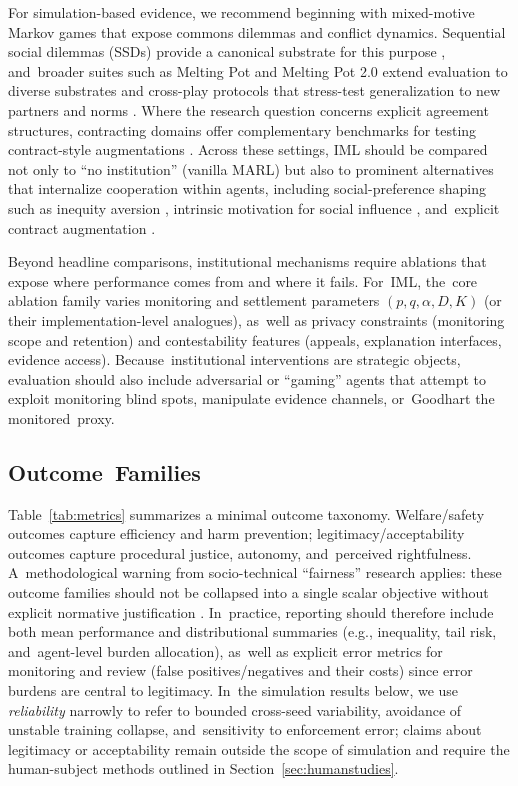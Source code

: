 \documentclass[mca,article,accept,pdftex,oneauthor]{Definitions/mdpi}
\begin{document}
For simulation-based evidence, we recommend beginning with mixed-motive Markov games that expose commons dilemmas and conflict dynamics. Sequential social dilemmas (SSDs) provide a canonical substrate for this purpose \citep{Leibo2017SSD}, and~broader suites such as Melting Pot and Melting Pot 2.0 extend evaluation to diverse substrates and cross-play protocols that stress-test generalization to new partners and norms \citep{Leibo2021MeltingPot,Agapiou2022MeltingPot2}. Where the research question concerns explicit agreement structures, contracting domains offer complementary benchmarks for testing contract-style augmentations \citep{Haupt2023Contracts}. Across these settings, IML should be compared not only to ``no institution'' (vanilla MARL) but also to prominent alternatives that internalize cooperation within agents, including social-preference shaping such as inequity aversion \citep{Hughes2018InequityAversion}, intrinsic motivation for social influence \citep{Jaques2019SocialInfluence}, and~explicit contract augmentation \citep{Haupt2023Contracts}.

Beyond headline comparisons, institutional mechanisms require ablations that expose where performance comes from and where it fails. For~IML, the~core ablation family varies monitoring and settlement parameters $(p,q,\alpha,D,K)$ (or their implementation-level analogues), as~well as privacy constraints (monitoring scope and retention) and contestability features (appeals, explanation interfaces, evidence access). Because~institutional interventions are strategic objects, evaluation should also include adversarial or ``gaming'' agents that attempt to exploit monitoring blind spots, manipulate evidence channels, or~Goodhart the monitored~proxy.

\subsection{Outcome~Families}
\label{sec:metrics}

Table~\ref{tab:metrics} summarizes a minimal outcome taxonomy. Welfare/safety outcomes capture efficiency and harm prevention; legitimacy/acceptability outcomes capture procedural justice, autonomy, and~perceived rightfulness. A~methodological warning from socio-technical ``fairness'' research applies: these outcome families should not be collapsed into a single scalar objective without explicit normative justification \citep{Selbst2019FairnessAbstraction}. In~practice, reporting should therefore include both mean performance and distributional summaries (e.g., inequality, tail risk, and~agent-level burden allocation), as~well as explicit error metrics for monitoring and review (false positives/negatives and their costs) since error burdens are central to legitimacy. In~the simulation results below, we use \emph{reliability} narrowly to refer to bounded cross-seed variability, avoidance of unstable training collapse, and~sensitivity to enforcement error; claims about legitimacy or acceptability remain outside the scope of simulation and require the human-subject methods outlined in Section~\ref{sec:humanstudies}.
\end{document}
